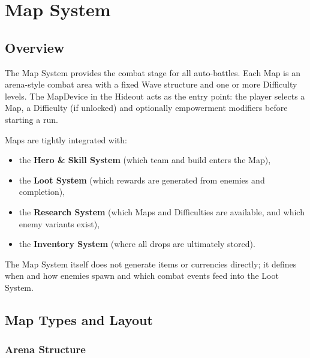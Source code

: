 \section{Map System}
\label{sec:map-system}

\subsection{Overview}

The Map System provides the combat stage for all auto-battles. 
Each Map is an arena-style combat area with a fixed Wave structure and one or more Difficulty levels. 
The MapDevice in the Hideout acts as the entry point: the player selects a Map, a Difficulty (if unlocked) and optionally empowerment modifiers before starting a run.

Maps are tightly integrated with:
\begin{itemize}
	\item the \textbf{Hero \& Skill System} (which team and build enters the Map),
	\item the \textbf{Loot System} (which rewards are generated from enemies and completion),
	\item the \textbf{Research System} (which Maps and Difficulties are available, and which enemy variants exist),
	\item the \textbf{Inventory System} (where all drops are ultimately stored).
\end{itemize}

The Map System itself does not generate items or currencies directly; it defines when and how enemies spawn and which combat events feed into the Loot System.


\subsection{Map Types and Layout}

\subsubsection*{Arena Structure}

